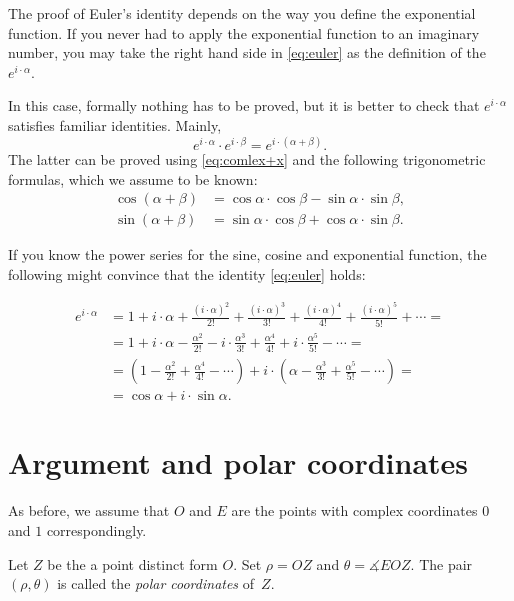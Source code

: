 The proof of Euler's identity depends on the way you define the exponential function.
If you never had to apply the exponential function to an imaginary number,
you may take the right hand side in \ref{eq:euler} 
as the definition of the $e^{i\cdot\alpha}$.

In this case, formally nothing has to be proved,
but it is better to check that $e^{i\cdot\alpha}$ satisfies familiar identities.
Mainly,
$$e^{i\cdot \alpha}\cdot e^{i\cdot \beta}= e^{i\cdot(\alpha+\beta)}.$$
The latter can be proved using \ref{eq:comlex+x} and the following trigonometric formulas,
which we assume to be known:
\begin{align*}
\cos(\alpha+\beta)&=\cos\alpha\cdot\cos\beta-\sin\alpha\cdot\sin\beta,
\\
\sin(\alpha+\beta)&=\sin\alpha\cdot\cos\beta+\cos\alpha\cdot\sin\beta.
\end{align*}

If you know the power series for the sine, cosine and exponential function, the following might convince that the identity \ref{eq:euler} holds:

\begin{align*}
 e^{i\cdot \alpha } &{}= 1 + i\cdot \alpha  + \frac{(i\cdot \alpha )^2}{2!} + \frac{(i\cdot \alpha  )^3}{3!} + \frac{(i\cdot \alpha )^4}{4!} + \frac{(i\cdot  \alpha )^5}{5!} +  \cdots =
 \\
&= 1 + i\cdot \alpha  - \frac{\alpha ^2}{2!} - i\cdot\frac{ \alpha ^3}{3!} + \frac{\alpha ^4}{4!} + i\cdot\frac{ \alpha ^5}{5!} -  \cdots =
\\
&= \left( 1 - \frac{\alpha ^2}{2!} + \frac{\alpha ^4}{4!}  - \cdots \right) +  i\cdot\left( \alpha  - \frac{\alpha ^3}{3!} + \frac{\alpha ^5}{5!} -  \cdots \right) =
\\
&= \cos \alpha  +  i\cdot\sin \alpha.
\end{align*}

\section*{Argument and polar coordinates}

As before, we assume that $O$ and $E$ are the points with complex coordinates $0$ and $1$ correspondingly.

Let $Z$ be the a point distinct form $O$.
Set $\rho=OZ$ and $\theta=\measuredangle EOZ$.
The pair $(\rho,\theta)$ is called the \emph{polar coordinates} of~$Z$.


